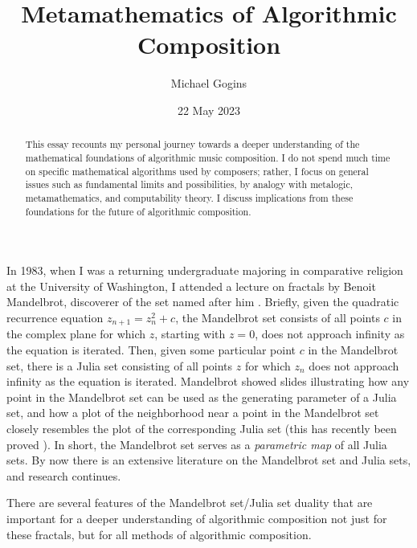 \documentclass[11pt]{scrartcl}
\title{Metamathematics of Algorithmic Composition}
\author{Michael Gogins}
\date{22 May 2023}                                           %
\begin{document}
\maketitle
\begin{abstract}
This essay recounts my personal journey towards a deeper understanding of the mathematical foundations of algorithmic music composition. I do not spend much time on specific mathematical algorithms used by composers; rather, I focus on general issues such as fundamental limits and possibilities, by analogy with metalogic, metamathematics, and computability theory. I discuss  implications from these foundations for the future of algorithmic composition. 
\end{abstract}

In 1983, when I was a returning undergraduate majoring in comparative religion at the University of Washington, I attended a lecture on fractals by Benoit Mandelbrot, discoverer of the set named after him \parencite{citeulike:580392, peitgen2004mandelbrot}. Briefly, given the quadratic recurrence equation $z_{n+1} = z_n^2 + c$, the Mandelbrot set consists of all points $c$ in the complex plane for which $z$, starting with $z = 0$, does not approach infinity as the equation is iterated. Then, given some particular point $c$ in the Mandelbrot set, there is a Julia set consisting of all points $z$ for which $z_n$ does not approach infinity as the equation is iterated.  Mandelbrot showed slides illustrating how any point in the Mandelbrot set can be used as the generating parameter of a Julia set, and how a plot of the neighborhood near a point in the Mandelbrot set closely resembles the plot of the corresponding Julia set \parencite{lei1990similarity} (this has recently been proved \parencite{kawahira2018julia}). In short, the Mandelbrot set serves as a \emph{parametric map} of all Julia sets. By now there is an extensive literature on the Mandelbrot set and Julia sets, and research continues. 

There are several features of the Mandelbrot set/Julia set duality that are important for a deeper understanding of algorithmic composition not just for these fractals, but for all methods of algorithmic composition.
\end{document}
